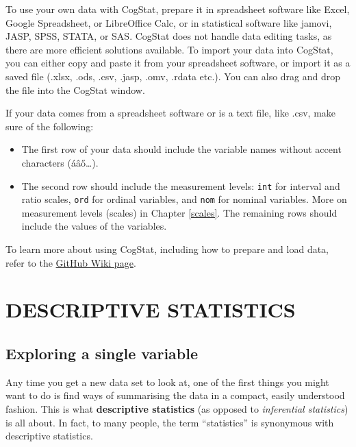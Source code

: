 \documentclass[
  11pt,
]{book}
\providecommand{\tightlist}{%
  \setlength{\itemsep}{0pt}\setlength{\parskip}{0pt}}
\theoremstyle{definition}
\theoremstyle{definition}
\theoremstyle{definition}
\theoremstyle{definition}
\theoremstyle{remark}
\begin{document}
To use your own data with CogStat, prepare it in spreadsheet software like Excel, Google Spreadsheet, or LibreOffice Calc, or in statistical software like jamovi, JASP, SPSS, STATA, or SAS. CogStat does not handle data editing tasks, as there are more efficient solutions available. To import your data into CogStat, you can either copy and paste it from your spreadsheet software, or import it as a saved file (.xlsx, .ods, .csv, .jasp, .omv, .rdata etc.). You can also drag and drop the file into the CogStat window.

If your data comes from a spreadsheet software or is a text file, like .csv, make sure of the following:

\begin{itemize}
\tightlist
\item
  The first row of your data should include the variable names without accent characters (áâő\ldots).
\item
  The second row should include the measurement levels: \texttt{int} for interval and ratio scales, \texttt{ord} for ordinal variables, and \texttt{nom} for nominal variables. More on measurement levels (scales) in Chapter \ref{scales}. The remaining rows should include the values of the variables.
\end{itemize}

To learn more about using CogStat, including how to prepare and load data, refer to the \href{https://github.com/cogstat/cogstat/wiki/Documentation-for-users}{GitHub Wiki page}.

\hypertarget{part-descriptive-statistics}{%
\part*{DESCRIPTIVE STATISTICS}\label{part-descriptive-statistics}}

\hypertarget{exploringavariable}{%
\chapter{Exploring a single variable}\label{exploringavariable}}

Any time you get a new data set to look at, one of the first things you might want to do is find ways of summarising the data in a compact, easily understood fashion. This is what \textbf{descriptive statistics} (as opposed to \emph{inferential statistics}) is all about. In fact, to many people, the term ``statistics'' is synonymous with descriptive statistics.
\end{document}
